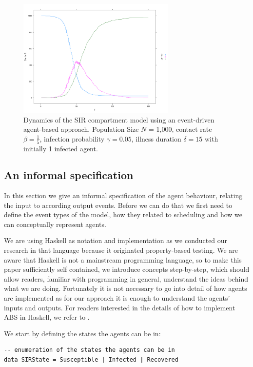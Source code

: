 \begin{figure}
	\centering
	\includegraphics[width=0.7\textwidth, angle=0]{./fig2.png}
	\caption{Dynamics of the SIR compartment model using an event-driven agent-based approach. Population Size $N$ = 1,000, contact rate $\beta =  \frac{1}{5}$, infection probability $\gamma = 0.05$, illness duration $\delta = 15$ with initially 1 infected agent.}
	\label{fig:sir_sd_dynamics}
\end{figure}

\subsection{An informal specification}
In this section we give an informal specification of the agent behaviour, relating the input to according output events. Before we can do that we first need to define the event types of the model, how they related to scheduling and how we can conceptually represent agents.

We are using Haskell as notation and implementation as we conducted our research in that language because it originated property-based testing. We are aware that Haskell is not a mainstream programming language, so to make this paper sufficiently self contained, we introduce concepts step-by-step, which should allow readers, familiar with programming in general, understand the ideas behind what we are doing. Fortunately it is not necessary to go into detail of how agents are implemented as for our approach it is enough to understand the agents' inputs and outputs. For readers interested in the details of how to implement ABS in Haskell, we refer to \cite{thaler_pure_2018}.

We start by defining the states the agents can be in:

\begin{footnotesize}
\begin{verbatim}
-- enumeration of the states the agents can be in
data SIRState = Susceptible | Infected | Recovered
\end{verbatim}
\end{footnotesize}

